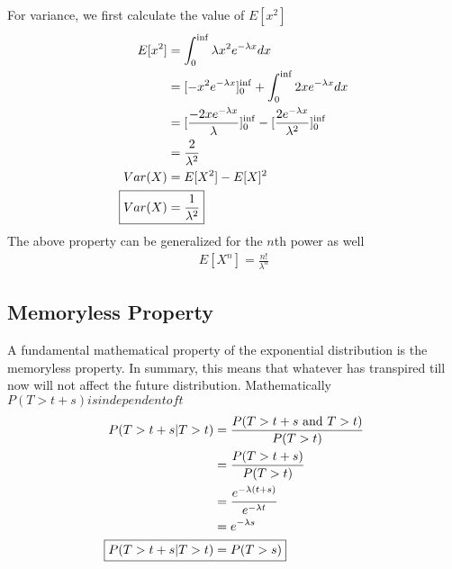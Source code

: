 \documentclass[../../probability-notes.tex]{subfiles}
\begin{document}
    For variance, we first calculate the value of $E[x^{2}]$
    \begin{align*}
        E[x^{2}] &= \int_{0}^{\inf} \lambda x^{2} e^{-\lambda x} dx\\
        &= [-x^{2} e^{-\lambda x}]_{0}^{\inf} + \int_{0}^{\inf} 2x e^{-\lambda x} dx\\
        &= [\frac{-2x e^{-\lambda x}}{\lambda}]_{0}^{\inf} - [\frac{2e^{-\lambda x}}{\lambda^{2}}]_{0}^{\inf}\\
        &= \frac{2}{\lambda^{2}}\\
        Var(X) &= E[X^{2}] - E[X]^{2}\\
        \Aboxed{Var(X) &= \frac{1}{\lambda^{2}}}
    \end{align*}
    The above property can be generalized for the $n$th power as well
    \begin{align*}
        E[X^{n}] = \frac{n!}{\lambda^{n}}
    \end{align*}

    \subsection{Memoryless Property}
    A fundamental mathematical property of the exponential distribution is the memoryless property. In summary, this means that whatever has transpired till now will not affect the future distribution. Mathematically $P(T > t+s) is independent of t$
    \begin{align*}
        P(T > t+s | T>t) &= \frac{P(T> t+s \text{ and }T > t)}{P(T > t)}\\
        &= \frac{P(T > t + s)}{P(T > t)}\\
        &= \frac{e^{-\lambda(t+s)}}{e^{-\lambda t}}\\
        &= e^{-\lambda s}\\
        \Aboxed{P(T > t+s | T>t) &= P(T > s)}
    \end{align*}
\end{document}
